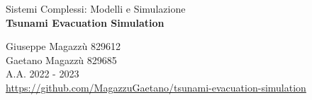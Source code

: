 \begin{titlepage}
  \vfill
  {\Large Sistemi Complessi: Modelli e Simulazione}\\[1cm]
  {\LARGE\bfseries Tsunami Evacuation Simulation}\\[0.4cm]
  \vfill


  \large
  Giuseppe Magazzù 829612\\
  Gaetano Magazzù 829685\\[1cm]


  {\large A.A. 2022 - 2023}\\[2cm]

  \small\url{https://github.com/MagazzuGaetano/tsunami-evacuation-simulation}

\end{titlepage}
 